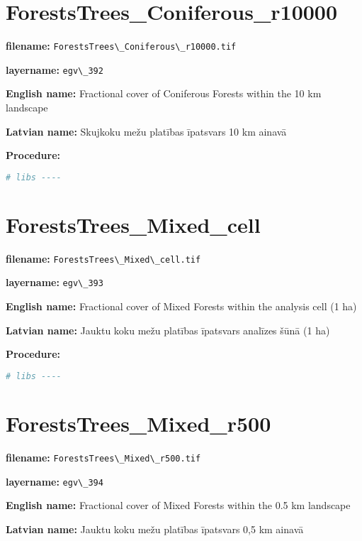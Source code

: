 \documentclass[
]{book}
\newcommand{\passthrough}[1]{#1}
\begin{document}
\section{ForestsTrees\_Coniferous\_r10000}\label{ch06.392}

\textbf{filename:} \passthrough{\lstinline!ForestsTrees\_Coniferous\_r10000.tif!}

\textbf{layername:} \passthrough{\lstinline!egv\_392!}

\textbf{English name:} Fractional cover of Coniferous Forests within the 10 km landscape

\textbf{Latvian name:} Skujkoku mežu platības īpatsvars 10 km ainavā

\textbf{Procedure:}

\begin{lstlisting}[language=R]
# libs ----
\end{lstlisting}

\section{ForestsTrees\_Mixed\_cell}\label{ch06.393}

\textbf{filename:} \passthrough{\lstinline!ForestsTrees\_Mixed\_cell.tif!}

\textbf{layername:} \passthrough{\lstinline!egv\_393!}

\textbf{English name:} Fractional cover of Mixed Forests within the analysis cell (1 ha)

\textbf{Latvian name:} Jauktu koku mežu platības īpatsvars analīzes šūnā (1 ha)

\textbf{Procedure:}

\begin{lstlisting}[language=R]
# libs ----
\end{lstlisting}

\section{ForestsTrees\_Mixed\_r500}\label{ch06.394}

\textbf{filename:} \passthrough{\lstinline!ForestsTrees\_Mixed\_r500.tif!}

\textbf{layername:} \passthrough{\lstinline!egv\_394!}

\textbf{English name:} Fractional cover of Mixed Forests within the 0.5 km landscape

\textbf{Latvian name:} Jauktu koku mežu platības īpatsvars 0,5 km ainavā
\end{document}
